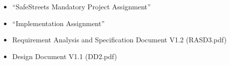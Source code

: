 \clearpage
{}
\label{sect:effort}



\clearpage
{}


\begin{itemize}
        \item “SafeStreets Mandatory Project Assignment”
        \item “Implementation Assignment”
        \item Requirement Analysis and Specification Document V1.2 (RASD3.pdf)
        \item Design Document V1.1 (DD2.pdf)
\end{itemize}


